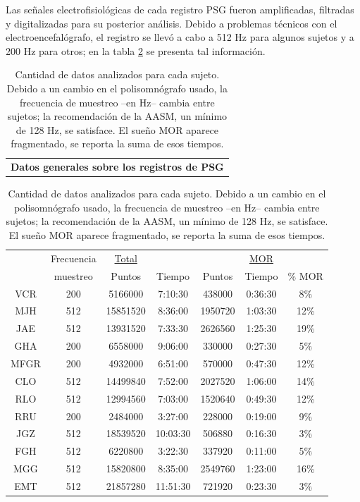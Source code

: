 \documentclass[12pt,a4paper]{mitthesis}
\begin{document}
Las se\~nales electrofisiol\'ogicas de cada registro PSG fueron amplificadas, filtradas y 
digitalizadas para su posterior an\'alisis.
Debido a problemas t\'ecnicos con el electroencefal\'ografo, el registro se llev\'o a cabo
a 512 Hz para algunos sujetos y a 200 Hz para otros; en la tabla \ref{frecuencias} se presenta tal 
informaci\'on.

\begin{table}
\centering
\begin{tabular}{c}
\textbf{Datos generales sobre los registros de PSG}
\vspace{1em}
\end{tabular}
\begin{tabular}{c||c|cc|ccc}
    &Frecuencia& \underline{Total}& &   &\underline{MOR} &         \\
    &muestreo  &Puntos  &  Tiempo   &Puntos  &  Tiempo   &  \% MOR \\
\hline
\hline
VCR &200       & 5166000&   7:10:30 &438000  &   0:36:30 & 8\% \\
MJH &512       &15851520&   8:36:00 &1950720 &   1:03:30 &12\% \\
JAE &512       &13931520&   7:33:30 &2626560 &   1:25:30 &19\% \\
GHA &200       &6558000 &   9:06:00 &330000  &   0:27:30 & 5\% \\
MFGR&200       &4932000 &   6:51:00 &570000  &   0:47:30 &12\% \\
\hline
CLO &512       &14499840&   7:52:00 &2027520 &   1:06:00 &14\% \\
RLO &512       &12994560&   7:03:00 &1520640 &   0:49:30 &12\% \\
RRU &200       &2484000 &   3:27:00 &228000  &   0:19:00 & 9\% \\
JGZ &512       &18539520&  10:03:30 &506880  &   0:16:30 & 3\% \\
\hline
FGH &512       &6220800 &   3:22:30 &337920  &   0:11:00 & 5\% \\
MGG &512       &15820800&   8:35:00 &2549760 &   1:23:00 &16\% \\
EMT &512       &21857280&  11:51:30 &721920  &   0:23:30 & 3\%
\end{tabular}
\caption{Cantidad de datos analizados para cada sujeto. Debido a un cambio en el polisomn\'ografo 
usado, la frecuencia de muestreo --en Hz-- cambia entre sujetos; la recomendaci\'on de la AASM, un 
m\'inimo de 128 Hz, se satisface.
El sue\~no MOR aparece fragmentado, se reporta la suma de esos tiempos.}
\label{frecuencias}
\end{table}
\end{document}
